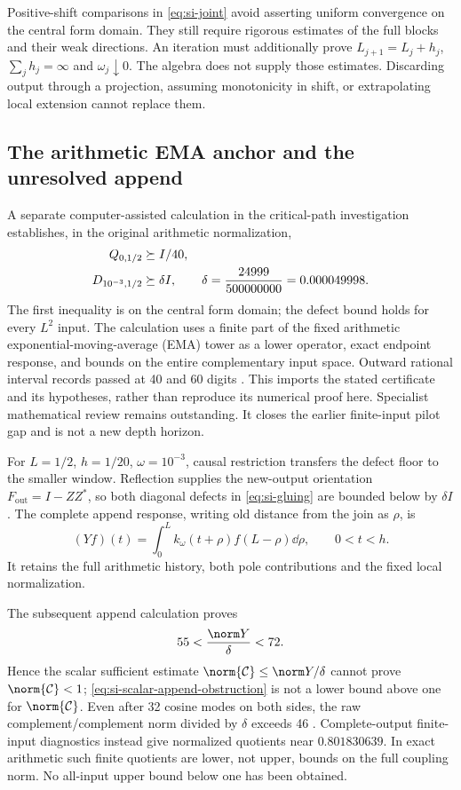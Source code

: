Positive-shift comparisons in \eqref{eq:si-joint} avoid asserting
uniform convergence on the central form domain. They still require
rigorous estimates of the full blocks and their weak directions.
An iteration must additionally prove
$L_{j+1}=L_j+h_j$, $\sum_jh_j=\infty$ and
$\omega_j\downarrow0$. The algebra does not supply those estimates.
Discarding output through a projection, assuming monotonicity
in shift, or extrapolating local extension cannot replace them.

\subsection{The arithmetic EMA anchor and the unresolved append}
\label{subsec:si-ema-progress}

A separate computer-assisted calculation in the critical-path
investigation establishes, in the original arithmetic normalization,
\begin{align}\label{eq:si-ema-anchor}
 Q_{0,1/2}&\succeq I/40,\\
 D_{10^{-3},1/2}&\succeq\delta I,\qquad
 \delta=\frac{24999}{500000000}=0.000049998.
 \notag
\end{align}
The first inequality is on the central form domain; the defect
bound holds for every $L^2$ input. The calculation uses a finite
part of the fixed arithmetic exponential-moving-average (EMA)
tower as a lower operator, exact endpoint response, and bounds
on the entire complementary input space. Outward rational interval
records passed at 40 and 60 digits \cite{EMAAnchor}.
This imports the stated certificate and its hypotheses, rather
than reproduce its numerical proof here. Specialist mathematical
review remains outstanding. It closes the earlier finite-input
pilot gap and is not a new depth horizon.

For $L=1/2$, $h=1/20$, $\omega=10^{-3}$, causal restriction transfers
the defect floor to the smaller window. Reflection supplies the
new-output orientation $F_{\mathrm{out}}=I-ZZ^*$, so both diagonal
defects in \eqref{eq:si-gluing} are bounded below by $\delta I$.
The complete append response, writing old distance from the join
as $\rho$, is
\[
 (Yf)(t)=\int_0^L k_\omega(t+\rho)f(L-\rho)\dd\rho,
 \qquad 0<t<h.
\]
It retains the full arithmetic history, both pole contributions
and the fixed local normalization.

The subsequent append calculation proves
\begin{equation}\label{eq:si-scalar-append-obstruction}
 55<\frac{\norm Y}{\delta}<72.
\end{equation}
Hence the scalar sufficient estimate
$\norm{\mathcal C}\leq\norm Y/\delta$ cannot prove
$\norm{\mathcal C}<1$; \eqref{eq:si-scalar-append-obstruction}
is not a lower bound above one for $\norm{\mathcal C}$.
Even after 32 cosine modes on both sides, the raw
complement/complement norm divided by $\delta$ exceeds 46
\cite{CumulativeAppend}. Complete-output finite-input diagnostics
instead give normalized quotients near $0.801830639$.
In exact arithmetic such finite quotients are lower, not upper,
bounds on the full coupling norm. No all-input upper bound below
one has been obtained.


